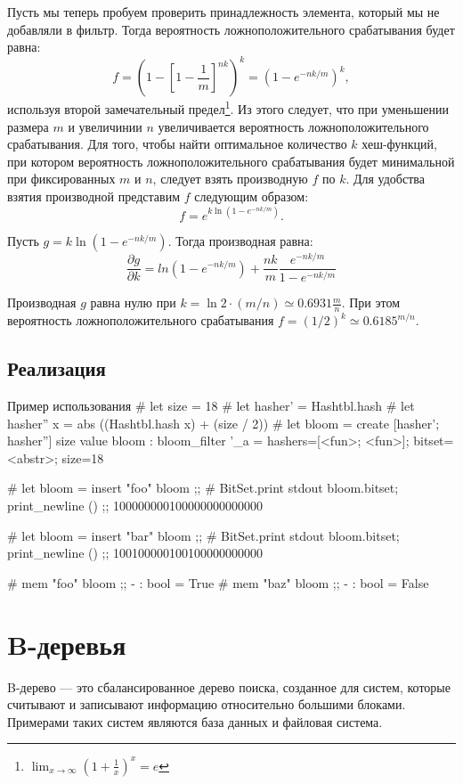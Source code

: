 Пусть мы теперь пробуем проверить принадлежность элемента, который мы не добавляли в фильтр. Тогда вероятность ложноположительного срабатывания будет равна:
\[
f= \left( 1 - \left[ 1 - \frac{1}{m} \right]^{nk} \right)^k =  \left( 1 - e^{-nk / m} \right)^k,
\]
используя второй замечательный предел\footnote{$\lim_{x \to \infty} \left( 1 + \frac{1}{x} \right)^x = e$}. Из этого следует, что при уменьшении размера $m$ и увеличинии $n$ увеличивается вероятность ложноположительного срабатывания. Для того, чтобы найти оптимальное количество $k$ хеш-функций, при котором вероятность ложноположительного срабатывания будет минимальной при фиксированных $m$ и $n$, следует взять производную $f$ по $k$. Для удобства взятия производной представим $f$ следующим образом:
\[
f = e^{k\ln(1 - e^{-nk / m})}.
\]

Пусть $g = k\ln(1 - e^{-nk / m})$. Тогда производная равна:
\[
\frac{\partial g}{\partial k} = ln(1 - e^{-nk / m}) + \frac{nk}{m} \frac{e^{-nk / m}}{1 - e^{-nk / m}}
\]

Производная $g$ равна нулю при $k = \ln 2 \cdot (m / n) \simeq 0.6931 \frac{m}{n}$. При этом вероятность ложноположительного срабатывания $f = (1 / 2)^k \simeq 0.6185^{m / n}$.

\subsection{Реализация}


\begin{ocamllst}{Пример использования}{}
# let size = 18
# let hasher' = Hashtbl.hash
# let hasher'' x = abs ((Hashtbl.hash x) + (size / 2))
# let bloom = create [hasher'; hasher''] size
value bloom : bloom_filter '_a =
  {hashers=[<fun>; <fun>]; bitset=<abstr>; size=18}

# let bloom = insert "foo" bloom ;;
# BitSet.print stdout bloom.bitset; print_newline () ;;
100000000100000000000000

# let bloom = insert "bar" bloom ;;
# BitSet.print stdout bloom.bitset; print_newline () ;;
100100000100100000000000

# mem "foo" bloom ;;
- : bool = True
# mem "baz" bloom ;;
- : bool = False
\end{ocamllst}

\section{B-деревья}
\label{sec:b-tree}
B-дерево — это сбалансированное дерево поиска, созданное для систем, которые считывают и записывают информацию относительно большими блоками. Примерами таких систем являются база данных и файловая система.

